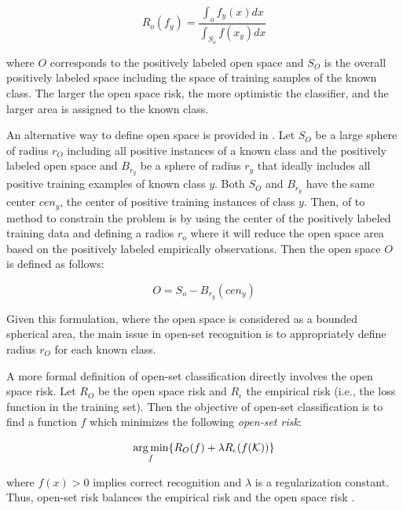 \begin{equation}\label{chap:eval_methods:eq:the_original_open_space_risk}
	R_{o}(f_y) = \frac{\int_{o} f_y(x) dx}{\int_{S_{o}}  f(x_y) dx}
\end{equation}

\noindent
where $O$ corresponds to the positively labeled open space and $S_O$ is the overall positively labeled space including the space of training samples of the known class. The larger the open space risk, the more optimistic the classifier, and the larger area is assigned to the known class.  

An alternative way to define open space is provided in  \parencite{fei2016breaking}. Let $S_O$ be a large sphere of radius $r_O$ including all positive instances of a known class and the positively labeled open space and $B_{r_y}$ be a sphere of radius $r_y$ that ideally includes all positive training examples of known class $y$. Both $S_O$ and $B_{r_y}$ have the same center $cen_y$, the center of positive training instances of class $y$. Then, of to method to constrain the problem is by using the center of the positively labeled training data and defining a radios $r_{o}$ where it will reduce the open space area based on the positively labeled empirically observations. Then the open space $O$ is defined as follows:

\begin{equation}\label{chap:eval_methods:eq:openspace_spherical_constrained}
	O = S_{o} - B_{r_{y}}(cen_{y})
\end{equation}

Given this formulation, where the open space is considered as a bounded spherical area, the main issue in open-set recognition is to appropriately define radius $r_O$ for each known class.

A more formal definition of open-set classification directly involves the open space risk. Let $R_{O}$ be the open space risk and $R_{\epsilon}$ the empirical risk (i.e., the loss function in the training set). Then the objective of open-set classification is to find a function $f$ which minimizes the following \textit{open-set risk}: 

\begin{equation}
\label{eq:open_space_risk}
\operatorname*{arg\,min}_{f} \{R_{O}(f ) + \lambda R_{\epsilon}(f (\mathcal{K}))\}
\end{equation}

\noindent where $f (x) > 0$ implies correct recognition and $\lambda$ is a regularization constant. Thus, open-set risk balances the empirical risk and the open space risk \parencite{geng2018recent}. 

